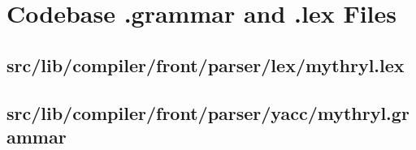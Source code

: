\section{Codebase .grammar and .lex Files}



\subsection{src/lib/compiler/front/parser/lex/mythryl.lex}


\subsection{src/lib/compiler/front/parser/yacc/mythryl.grammar}



